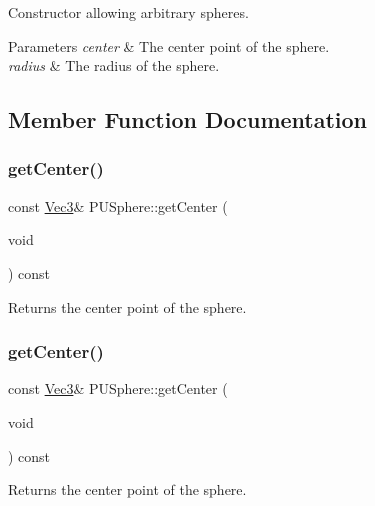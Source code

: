 Constructor allowing arbitrary spheres. 
\begin{DoxyParams}{Parameters}
{\em center} & The center point of the sphere. \\
\hline
{\em radius} & The radius of the sphere. \\
\hline
\end{DoxyParams}


\subsection{Member Function Documentation}
\mbox{\label{classPUSphere_a082ae4c40dd72db44015d9024b91edf5}} 
\subsubsection{\texorpdfstring{get\+Center()}{getCenter()}\hspace{0.1cm}{\footnotesize\ttfamily [1/2]}}
{\footnotesize\ttfamily const \hyperlink{classVec3}{Vec3}\& P\+U\+Sphere\+::get\+Center (\begin{DoxyParamCaption}\item[{void}]{ }\end{DoxyParamCaption}) const\hspace{0.3cm}{\ttfamily [inline]}}

Returns the center point of the sphere. \mbox{\label{classPUSphere_a082ae4c40dd72db44015d9024b91edf5}} 
\subsubsection{\texorpdfstring{get\+Center()}{getCenter()}\hspace{0.1cm}{\footnotesize\ttfamily [2/2]}}
{\footnotesize\ttfamily const \hyperlink{classVec3}{Vec3}\& P\+U\+Sphere\+::get\+Center (\begin{DoxyParamCaption}\item[{void}]{ }\end{DoxyParamCaption}) const\hspace{0.3cm}{\ttfamily [inline]}}

Returns the center point of the sphere. \mbox{\label{classPUSphere_addc27e2bf80742bf0a15ec81ceb94e97}} 
